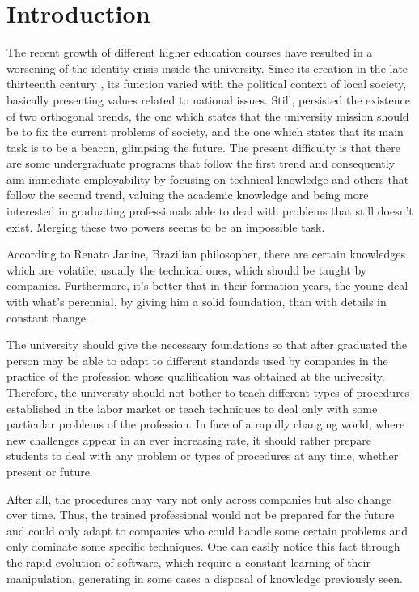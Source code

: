 \documentclass[conference]{IEEEtran}
\begin{document}
\section{Introduction}
	The recent growth of different higher education courses have resulted in a worsening of the identity crisis inside the university. Since its creation in the late thirteenth century \cite{oliveira:origem_universidades}, its function varied with the political context of local society, basically presenting values related to national issues. Still, persisted the existence of two orthogonal trends, the one which states that the university mission should be to fix the current problems of society, and the one which states that its main task is to be a beacon, glimpsing the future. The present difficulty is that there are some undergraduate programs that follow the first trend and consequently aim immediate employability by focusing on technical knowledge and others that follow the second trend, valuing the academic knowledge and being more interested in graduating professionals able to deal with problems that still doesn't exist. Merging these two powers seems to be an impossible task.
	
	According to Renato Janine, Brazilian philosopher, there are certain knowledges which are volatile, usually the technical ones, which should be taught by companies. Furthermore, it's better that in their formation years, the young deal with what's perennial, by giving him a solid foundation, than with details in constant change \cite{ribeiro:universidade_vida_atual}.

	The university should give the necessary foundations so that after graduated the person may be able to adapt to different standards used by companies in the practice of the profession whose qualification was obtained at the university. Therefore, the university should not bother to teach different types of procedures established in the labor market or teach techniques to deal only with some particular problems of the profession. In face of a rapidly changing world, where new challenges appear in an ever increasing rate, it should rather prepare students to deal with any problem or types of procedures at any time, whether present or future.

	After all, the procedures may vary not only across companies but also change over time. Thus, the trained professional would not be prepared for the future and could only adapt to companies who could handle some certain problems and only dominate some specific techniques. One can easily notice this fact through the rapid evolution of software, which require a constant learning of their manipulation, generating in some cases a disposal of knowledge previously seen.
\end{document}
